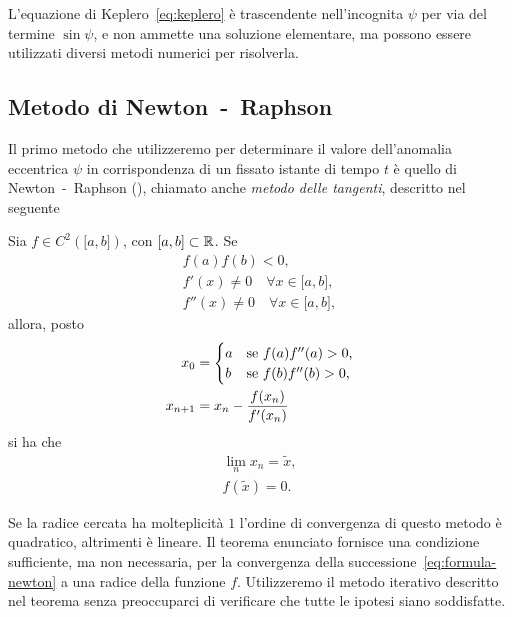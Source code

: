 L'equazione di Keplero~\eqref{eq:keplero} è trascendente nell'incognita $\psi$
per via del termine $\sin\psi$, e non ammette una soluzione elementare, ma
possono essere utilizzati diversi metodi numerici per risolverla.

\subsection{Metodo di Newton~-~Raphson}
\label{sec:newton}

Il primo metodo che utilizzeremo per determinare il valore dell'anomalia
eccentrica $\psi$ in corrispondenza di un fissato istante di tempo $t$ è quello
di Newton~-~Raphson (\textcite{brugnano:calcolo-numerico}), chiamato anche
\emph{metodo delle tangenti}, descritto nel seguente
\begin{teorema}
  Sia $f\in C^2(\mathopen{[}a,b\mathclose{]})$, con
  $\mathopen{[}a,b\mathclose{]}\subset\mathbb{R}$. Se
  \begin{subequations}
    \begin{gather}
      f(a)f(b) <0, \label{eq:esistenza-zero}\\
      f'(x) \neq 0 \quad \forall x \in \mathopen{[}a,b\mathclose{]},\\
      f''(x) \neq 0 \quad \forall x \in \mathopen{[}a,b\mathclose{]},
    \end{gather}
  \end{subequations}
  allora, posto
  \begin{subequations}
    \begin{align}
      x_0 &=
      \begin{cases}
        a & \text{se $ f(a)f''(a)>0$,}\\
        b & \text{se $f(b)f''(b)>0$,}
      \end{cases}\\
      x_{n+1} &= x_n - \frac{f(x_n)}{f'(x_n)} \label{eq:formula-newton}
    \end{align}
  \end{subequations}
  si ha che
  \begin{subequations}
    \begin{gather}
      \lim_n x_n = \tilde{x},\\
      f(\tilde{x}) = 0.
    \end{gather}
  \end{subequations}
\end{teorema}
Se la radice cercata ha molteplicità $1$ l'ordine di convergenza di questo
metodo è quadratico, altrimenti è lineare. Il teorema enunciato fornisce una
condizione sufficiente, ma non necessaria, per la convergenza della
successione~\eqref{eq:formula-newton} a una radice della funzione
$f$. Utilizzeremo il metodo iterativo descritto nel teorema senza preoccuparci
di verificare che tutte le ipotesi siano soddisfatte.

